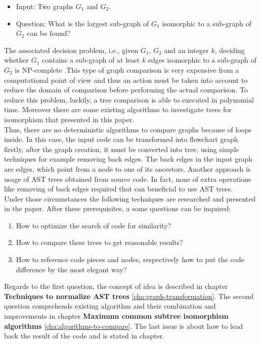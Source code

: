 \documentclass{report}
\begin{document}
\begin{itemize}
	\item     Input: Two graphs $ G_{1}$ and $G_{2}$.
	\item     Question: What is the largest sub-graph of  $ G_{1}$ isomorphic to a sub-graph of  $ G_{2}$ can be found?
\end{itemize}

The associated decision problem, i.e., given $ G_{1}$, $ G_{2}$ and an integer $k$, deciding whether $ G_{1}$ contains a sub-graph of at least $k$ edges isomorphic to a sub-graph of $ G_{2}$ is NP-complete \cite{graph_isomorphism_is}.This type of graph comparison is very expensive from a computational point of view and thus an action must be taken into account to reduce the domain of comparison before performing the actual comparison. To reduce this problem, luckily, a tree comparison is able to executed in polynomial time. Moreover there are some existing algorithms to investigate trees for isomorphism that presented in this paper.
\\

\noindent
Thus, there are no deterministic algorithms to compare graphs because of loops inside. In this case, the input code can be transformed into flowchart graph firstly, after the graph creation, it must be converted into tree, using simple techniques for example removing back edges. The back edges in the input graph are edges, which point from a node to one of its ancestors. Another approach is usage of AST trees obtained from source code. In fact, none of extra operations like removing of back edges required that can beneficial to use AST trees.
\\
Under those circumstances the following techniques are researched and presented in the paper.
After these prerequisites, a some questions can be inquired:
\begin{enumerate}
 \item How to optimize the search of code for similarity?  
  \item How to compare these trees to get reasonable results?
  \item How to reference code pieces and nodes, respectively how to put the code difference by the most elegant way?
\end{enumerate}

Regards to the first question, the concept of idea is described in chapter \textbf{Techniques to normalize AST trees} \ref{cha:graph-transformation}. The second question comprehends existing algorithm and their combination and improvements in chapter \textbf{Maximum common subtree isomorphism algorithms} \ref{cha:algorithms-to-compare}. The last issue is about how to lead back the result of the code and is stated in chapter.
\end{document}
